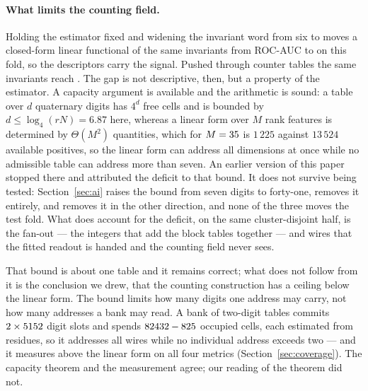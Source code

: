 \documentclass[11pt]{article}
\begin{document}
\paragraph{What limits the counting field.} Holding the estimator fixed and
widening the invariant word from six to \NAlgFeatures{} moves a closed-form
linear functional of the same invariants from ROC-AUC \FisherSix{} to \FisherAll{} on this
fold, so the descriptors carry the signal. Pushed through counter tables the
same invariants reach \AlgAuc{}. The gap is not descriptive, then, but a
property of the estimator. A capacity argument is available and the arithmetic
is sound: a table over \(d\) quaternary digits has \(4^{d}\) free cells and is
bounded by \(d \le \log_4(rN) = 6.87\) here, whereas a linear form over \(M\)
rank features is determined by \(\Theta(M^{2})\) quantities, which for
\(M=35{}\) is \(1\,225\) against \(13\,524\) available positives, so
the linear form can address all \NAlgFeatures{} dimensions at once while no
admissible table can address more than seven. An earlier version of this paper
stopped there and attributed the deficit to that bound. It does not survive
being tested: Section~\ref{sec:ai} raises the bound from seven digits to
forty-one, removes it entirely, and removes it in the other direction, and none
of the three moves the test fold. What does account for the deficit, on the
same cluster-disjoint half, is the fan-out --- the \NAlgTables{} integers that
add the block tables together --- and \GapExtraWires{} wires that the fitted
readout is handed and the counting field never sees.

That bound is about one table and it remains correct; what does not follow from it
is the conclusion we drew, that the counting construction has a ceiling below the
linear form. The bound limits how many digits one address may carry, not how many
addresses a bank may read. A bank of \NTabTables{} two-digit tables commits
\(2{} \times 5152{}\) digit slots and spends
\(82432{} - 825{}\) occupied cells, each estimated from
\TabCellOccupancy{} residues, so it addresses all \NTabWires{} wires while no
individual address exceeds two --- and it measures above the linear form on all
four metrics (Section~\ref{sec:coverage}). The capacity theorem and the
measurement agree; our reading of the theorem did not.
\end{document}
